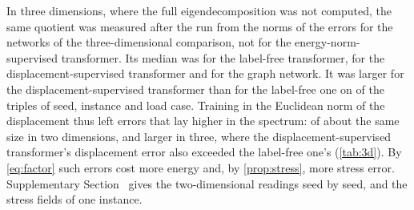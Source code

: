 In three dimensions, where the full eigendecomposition was not computed, the same quotient
was measured after the run from the norms of the errors for the networks of the
three-dimensional comparison, not for the energy-norm-supervised transformer. Its median was
\numFieldRqFree{} for the label-free transformer, \numFieldRqLab{} for the
displacement-supervised transformer and \numFieldRqMgn{} for the graph network. It was larger for the displacement-supervised
transformer than for the label-free one on
\numFieldRqAboveLab{} of the \numFieldLoads{} triples of seed, instance and load case.
Training in the Euclidean norm of the displacement thus left errors that lay higher in the
spectrum: of about the same size in two dimensions, and larger in three, where the
displacement-supervised transformer's displacement error also exceeded the label-free one's
(\cref{tab:3d}). By \eqref{eq:factor} such errors cost more energy and, by
\cref{prop:stress}, more stress error. Supplementary Section~\SuppTwo{} gives the
two-dimensional readings seed by seed, and the stress fields of one instance.

